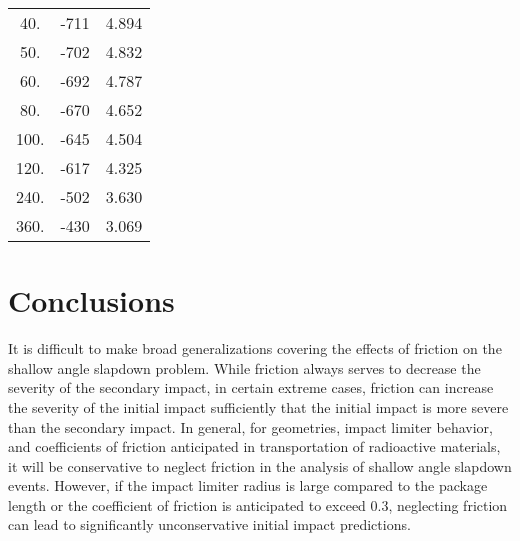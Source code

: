 \begin{table}
\begin{center}
\begin{tabular}{||c|c|c||}
         40.                &-711                  &4.894\\
         50.                &-702                  &4.832\\
         60.                &-692                  &4.787\\
         80.                &-670                  &4.652\\
        100.                &-645                  &4.504\\
        120.                &-617                  &4.325\\
        240.                &-502                  &3.630\\
        360.                &-430                  &3.069\\
\hline
\end{tabular}
\end{center}
\end{table} 

\section{Conclusions}

     It is difficult to make broad generalizations covering the
effects of friction on the shallow angle slapdown problem.  While
friction always serves to decrease the severity of the secondary
impact, in certain extreme cases, friction can increase the severity
of the initial impact sufficiently that the initial impact is more
severe than the secondary
impact.  In general, for geometries, impact
limiter behavior, and coefficients of friction anticipated in
transportation of radioactive materials, it will be conservative to
neglect friction in the analysis of shallow angle slapdown events.
However, if the impact limiter radius is large compared to the package
length or the coefficient of friction is anticipated to exceed 0.3,
neglecting friction can lead to significantly
unconservative initial impact predictions.
